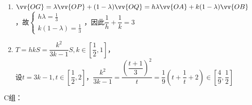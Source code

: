 \begin{enumerate}
    \begin{jieda}
        \begin{enumerate}
            \item $\vv{OG} = \lambda \vv{OP} + (1-\lambda)\vv{OQ} = h\lambda \vv{OA} + k(1-\lambda)\vv{OB}$，故$\left\{\begin{array}{l}
                 h\lambda = \frac{1}{3}  \\
                 k(1-\lambda) = \frac{1}{3}
            \end{array}\right. $，因此$\dfrac{1}{h} + \dfrac{1}{k} = 3$
            \item $T = hkS = \dfrac{k^2}{3k-1}S, k \in \left[\dfrac{1}{2}, 1\right]$，\\
            设$t = 3k-1, t \in \left[\dfrac{1}{2}, 2\right]$，$\dfrac{k^2}{3k-1} = \dfrac{\left(\dfrac{t+1}{3}\right)^2}{t}  = \dfrac{1}{9}\left(t+\dfrac{1}{t}+2\right) \in \left[\dfrac{4}{9}, \dfrac{1}{2}\right]$
        \end{enumerate}
    \end{jieda}
\end{enumerate}
C组：
